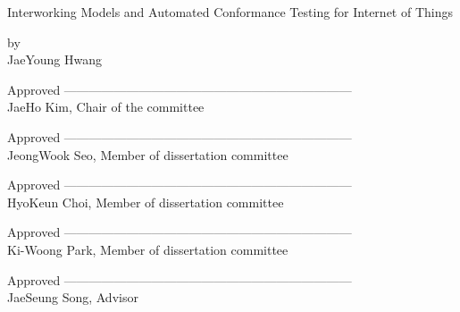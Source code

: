 \begin{titlepage}
    \begin{center}
    	
        \vfill
        \fontsize{21}{11}\textnormal {Interworking Models and Automated Conformance Testing for Internet of Things}
        \vfill
        
        \textnormal{\Large by \\ JaeYoung Hwang}
        \vfill
        \vfill
        
        \textnormal{\large Approved ---------------------------------------------------------------------\\}
        \hspace{-1.72cm}\textnormal{\large JaeHo Kim, Chair of the committee \quad \\}
        
        \vspace{0.4cm}
        \textnormal{\large Approved ---------------------------------------------------------------------\\}
        \hspace{1cm}\textnormal{\large JeongWook Seo, Member of dissertation committee \\}
        
        \vspace{0.4cm}
        \textnormal{\large Approved ---------------------------------------------------------------------\\}
        \hspace{0.85cm}\textnormal{\large HyoKeun Choi, Member of dissertation committee \\}
        
        \vspace{0.4cm}
        \textnormal{\large Approved ---------------------------------------------------------------------\\}
        \hspace{1cm}\textnormal{\large Ki-Woong Park, Member of dissertation committee \\}
        
        \vspace{0.4cm}
        \textnormal{\large Approved ---------------------------------------------------------------------\\}
        \hspace{-3.6cm}\textnormal{\large JaeSeung Song, Advisor \\}
        
        \vfill
    \end{center}
\end{titlepage}
